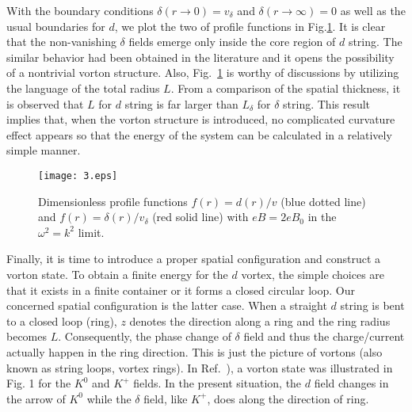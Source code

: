 \documentclass[12pt]{article}
\begin{document}
With the boundary conditions $\delta(r \rightarrow 0) = v_\delta$ and $\delta(r \rightarrow \infty) = 0$
as well as the usual boundaries for $d$, we plot the two of profile functions in Fig.\ref{fig:3}.
It is clear that the non-vanishing $\delta$ fields emerge only inside the core region of $d$ string.
The similar behavior had been obtained in the literature and it opens the possibility of a nontrivial
vorton structure. Also, Fig.~\ref{fig:3} is worthy of discussions by utilizing the language of the
total radius $L$.
From a comparison of the spatial thickness, it is observed that $L$ for $d$ string is far larger than
$L_\delta$ for $\delta$ string. This result implies that, when the vorton structure is introduced, no
complicated curvature effect appears so that the energy of the system can be calculated in a relatively
simple manner.

\begin{figure}
	\texttt{[image: 3.eps]}
	\caption{Dimensionless profile functions $f(r)=d(r)/v$ (blue dotted line) and
     $f(r)=\delta(r)/v_\delta$ (red solid line) with $eB= 2 eB_0$ in the $\omega^2 = k^2$ limit.
     }
	\label{fig:3}
\end{figure}

Finally, it is time to introduce a proper spatial configuration and construct a vorton state.
To obtain a finite energy for the $d$ vortex, the simple choices are that it exists in a finite
container or it forms a closed circular loop.
Our concerned spatial configuration is the latter case. When a straight $d$ string is bent to a
closed loop (ring), $z$ denotes the direction along a ring and the ring radius becomes $L$.
Consequently, the phase change of $\delta$ field and thus the charge/current actually happen in
the ring direction. This is just the picture of vortons (also known as string loops, vortex rings).
In Ref.~\cite{bedaque2011vortons}), a vorton state was illustrated in Fig. 1 for the $K^0$ and
$K^+$ fields. In the present situation, the $d$ field changes in the arrow of $K^0$ while the
$\delta$ field, like $K^+$, does along the direction of ring.
\end{document}
